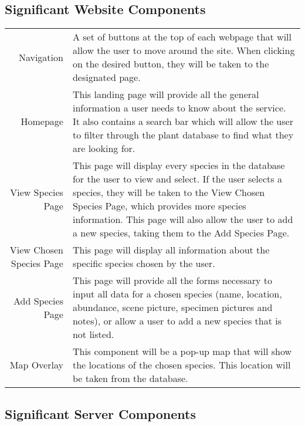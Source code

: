 \subsection{Significant Website Components}
	\begin{tabular}{r p{10cm}}
	Navigation & A set of buttons at the top of each webpage that will allow the user to move around the site. When clicking on the desired button, they will be taken to the designated page.\\

	Homepage & This landing page will provide all the general information a user needs to know about the service. It also contains a search bar which will allow the user to filter through the plant database to find what they are looking for. \\

	View Species Page & This page will display every species in the database for the user to view and select. If the user selects a species, they will be taken to the View Chosen Species Page, which provides more species information. This page will also allow the user to add a new species, taking them to the Add Species Page. \\

	View Chosen Species Page & This page will display all information about the specific species chosen by the user. \\

	Add Species Page & This page will provide all the forms necessary to input all data for a chosen species (name, location, abundance, scene picture, specimen pictures and notes), or allow a user to add a new species that is not listed. \\

	Map Overlay & This component will be a pop-up map that will show the locations of the chosen species. This location will be taken from the database.\\
	\end{tabular}

\clearpage
\subsection{Significant Server Components}


